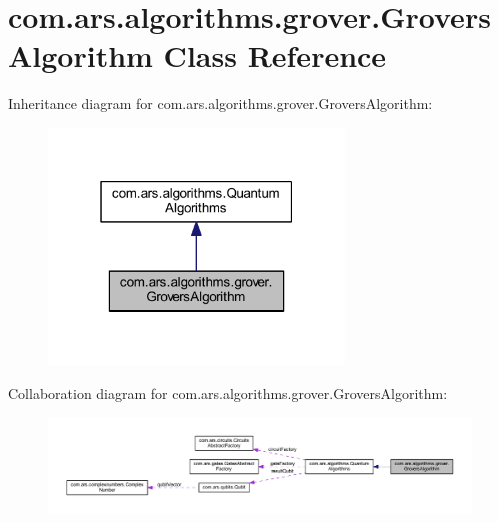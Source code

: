 \hypertarget{classcom_1_1ars_1_1algorithms_1_1grover_1_1_grovers_algorithm}{}\section{com.\+ars.\+algorithms.\+grover.\+Grovers\+Algorithm Class Reference}
\label{classcom_1_1ars_1_1algorithms_1_1grover_1_1_grovers_algorithm}


Inheritance diagram for com.\+ars.\+algorithms.\+grover.\+Grovers\+Algorithm\+:\nopagebreak
\begin{figure}[H]
\begin{center}
\leavevmode
\includegraphics[width=223pt]{classcom_1_1ars_1_1algorithms_1_1grover_1_1_grovers_algorithm__inherit__graph}
\end{center}
\end{figure}


Collaboration diagram for com.\+ars.\+algorithms.\+grover.\+Grovers\+Algorithm\+:
\nopagebreak
\begin{figure}[H]
\begin{center}
\leavevmode
\includegraphics[width=350pt]{classcom_1_1ars_1_1algorithms_1_1grover_1_1_grovers_algorithm__coll__graph}
\end{center}
\end{figure}

